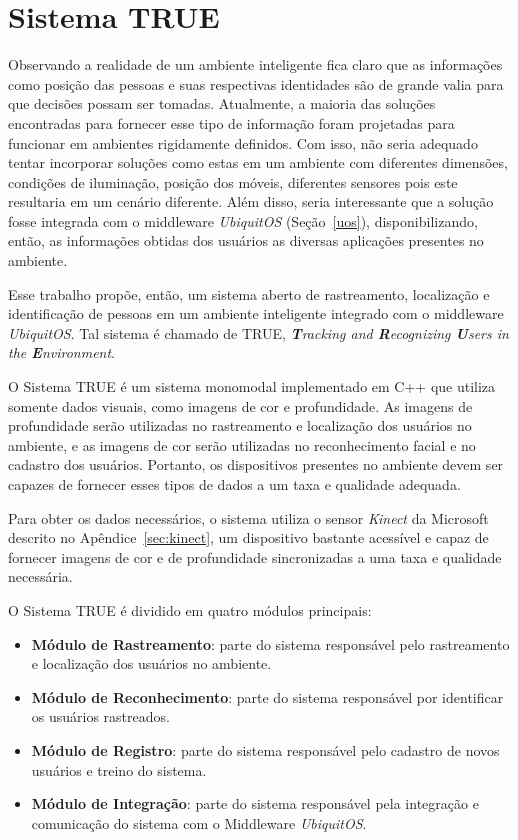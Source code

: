 \chapter{Sistema TRUE}

Observando a realidade de um ambiente inteligente fica claro que as informações como posição das pessoas e suas respectivas identidades são de grande valia para que decisões possam ser tomadas. Atualmente, a maioria das soluções encontradas para fornecer esse tipo de informação foram projetadas para funcionar em ambientes rigidamente definidos. Com isso, não seria adequado tentar incorporar soluções como estas em um ambiente com diferentes dimensões, condições de iluminação, posição dos móveis, diferentes sensores pois este resultaria em um cenário diferente. Além disso, seria interessante que a solução fosse integrada com o middleware \textit{UbiquitOS} (Seção~\ref{uos}), disponibilizando, então, as informações obtidas dos usuários as diversas aplicações presentes no ambiente.


Esse trabalho propõe, então, um sistema aberto de rastreamento, localização e identificação de pessoas em um ambiente inteligente integrado com o middleware \textit{UbiquitOS}. Tal sistema é chamado de TRUE, \textit{\textbf{T}racking and \textbf{R}ecognizing \textbf{U}sers in the \textbf{E}nvironment}.

O Sistema TRUE é um sistema monomodal implementado em C++ que utiliza somente dados visuais, como imagens de cor e profundidade. As imagens de profundidade serão utilizadas no rastreamento e localização dos usuários no ambiente, e as imagens de cor serão utilizadas no reconhecimento facial e no cadastro dos usuários. Portanto, os dispositivos presentes no ambiente devem ser capazes de fornecer esses tipos de dados a um taxa e qualidade adequada. 

Para obter os dados necessários, o sistema utiliza o sensor \textit{Kinect} da Microsoft descrito no Apêndice~\ref{sec:kinect}, um dispositivo bastante acessível e capaz de fornecer imagens de cor e de profundidade sincronizadas a uma taxa e qualidade necessária.

O Sistema TRUE é dividido em quatro módulos principais:

	\begin{itemize}
		\item \textbf{Módulo de Rastreamento}: parte do sistema responsável pelo rastreamento e localização dos usuários no ambiente.
		\item \textbf{Módulo de Reconhecimento}: parte do sistema responsável por identificar os usuários rastreados.
		\item \textbf{Módulo de Registro}: parte do sistema responsável pelo cadastro de novos usuários e treino do sistema.
		\item \textbf{Módulo de Integração}: parte do sistema responsável pela integração e comunicação do sistema com o Middleware \textit{UbiquitOS}.
	\end{itemize}

